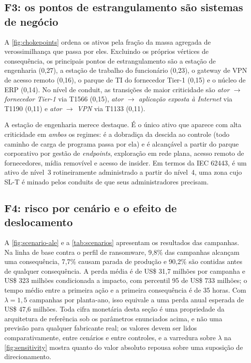 \subsection{F3: os pontos de estrangulamento são sistemas de negócio}

A \cref{fig:chokepoints} ordena os ativos pela fração da massa agregada de
verossimilhança que passa por eles. Excluindo os próprios vértices de
consequência, os principais pontos de estrangulamento são a estação de
engenharia (0,27), a estação de trabalho do funcionário (0,23), o gateway de
VPN de acesso remoto (0,16), o parque de TI do fornecedor Tier-1 (0,15) e o
núcleo de ERP (0,14). No nível de conduit, as transições de maior criticidade
são \emph{ator $\to$ fornecedor Tier-1} via T1566 (0,15), \emph{ator $\to$
aplicação exposta à Internet} via T1190 (0,11) e \emph{ator $\to$ VPN} via
T1133 (0,11).

A estação de engenharia merece destaque. É o único ativo que aparece com alta
criticidade em \emph{ambos} os regimes: é a dobradiça da descida ao controle
(todo caminho de carga de programa passa por ela) e é alcançável a partir do
parque corporativo por gestão de \emph{endpoints}, exploração em rede plana,
acesso remoto de fornecedores, mídia removível e acesso de insider. Em termos
da IEC 62443, é um ativo de nível~3 rotineiramente administrado a partir do nível~4, uma zona cujo SL-T é minado pelos conduits
de que seus administradores precisam.



\subsection{F4: risco por cenário e o efeito de deslocamento}

A \cref{fig:scenario-ale} e a \cref{tab:scenarios} apresentam os resultados das
campanhas. Na linha de base contra o perfil de ransomware, 9,8\% das campanhas
alcançam uma consequência, 7,7\% causam parada de produção e 90,2\% são contidas
antes de qualquer consequência. A perda média é de US\$ 31,7 milhões por
campanha e US\$ 323 milhões condicionada a impacto, com percentil 95 de US\$ 733
milhões; o tempo médio entre a primeira ação e a primeira consequência é de 35
horas. Com $\lambda = 1{,}5$ campanhas por planta-ano, isso equivale a uma perda
anual esperada de US\$ 47,6 milhões. Toda cifra monetária desta seção é uma
propriedade da arquitetura de referência sob os parâmetros enunciados acima, e
não uma previsão para qualquer fabricante real; os valores devem ser lidos
comparativamente, entre cenários e entre controles, e a varredura sobre
$\lambda$ na \cref{fig:sensitivity} mostra quanto do valor absoluto repousa
sobre uma suposição de direcionamento.

